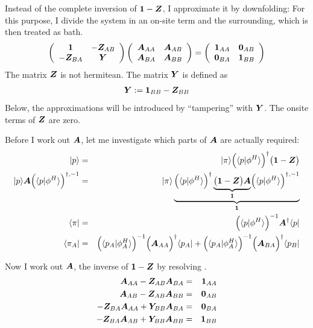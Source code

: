 \documentclass[11pt,a4paper]{report}
\begin{document}
Instead of the complete inversion of $\bm{1}-\bm{Z}$, I approximate
it by downfolding: For this purpose, I divide the system in an on-site
term and the surrounding, which is then treated as bath.
\begin{eqnarray}
\left(\begin{array}{cc}\bm{1} &-\bm{Z}_{AB}
\\-\bm{Z}_{BA} & \bm{Y}\end{array}\right)
\left(\begin{array}{cc} \bm{A}_{AA}&\bm{A}_{AB}
\\\bm{A}_{BA} & \bm{A}_{BB}\end{array}\right)
=
\left(\begin{array}{cc} \bm{1}_{AA}&\bm{0}_{AB}
\\\bm{0}_{BA} & \bm{1}_{BB}\end{array}\right)
\label{eq:downfoldingoneminusz}
\end{eqnarray}
The matrix $\bm{Z}$ is not hermitean.  The matrix $\bm{Y}$ is
defined as
\begin{eqnarray}
\bm{Y}:=\bm{1}_{BB}-\bm{Z}_{BB}
\end{eqnarray}
Below, the approximations will be introduced by ``tampering'' with
$\bm{Y}$. The onsite terms of $\bm{Z}$ are zero. 

Before I work out $\bm{A}$, let me investigate which parts of $\bm{A}$
are actually required:
\begin{eqnarray}
|p\rangle&=&|\pi\rangle\Bigl(\langle{p}|\phi^H\rangle\Bigr)^{\dagger}
\bigl(\bm{1}-\bm{Z}\bigr)
\nonumber\\
|p\rangle\bm{A}\Bigl(\langle{p}|\phi^H\rangle\Bigr)^{\dagger,-1}
&=&|\pi\rangle
\underbrace{
\Bigl(\langle{p}|\phi^H\rangle\Bigr)^{\dagger}
\underbrace{
\bigl(\bm{1}-\bm{Z}\bigr)\bm{A}
}_{\bm{1}}
\Bigl(\langle{p}|\phi^H\rangle\Bigr)^{\dagger,-1}
}_{\bm{1}}
\nonumber\\
\langle\pi|&=&
\Bigl(\langle{p}|\phi^H\rangle\Bigr)^{-1}\bm{A}^\dagger\langle{p}|
\nonumber\\
\langle\pi_A|&=&
\Bigl(\langle{p}_A|\phi^H_A\rangle\Bigr)^{-1}
\Bigl(\bm{A}_{AA}\Bigr)^\dagger\langle{p}_A|
+
\Bigl(\langle{p}_A|\phi^H_A\rangle\Bigr)^{-1}
\Bigl(\bm{A}_{BA}\Bigr)^\dagger\langle{p}_B|
\end{eqnarray}


Now I work out $\bm{A}$, the inverse of $\bm{1}-\bm{Z}$ by
resolving .
\begin{eqnarray}
\bm{A}_{AA}-\bm{Z}_{AB}\bm{A}_{BA}&=&\bm{1}_{AA}
\nonumber\\
\bm{A}_{AB}-\bm{Z}_{AB}\bm{A}_{BB}&=&\bm{0}_{AB}
\nonumber\\
-\bm{Z}_{BA}\bm{A}_{AA}+\bm{Y}_{BB}\bm{A}_{BA}&=&\bm{0}_{BA}
\nonumber\\
-\bm{Z}_{BA}\bm{A}_{AB}+\bm{Y}_{BB}\bm{A}_{BB}&=&\bm{1}_{BB}
\end{eqnarray}
\end{document}
